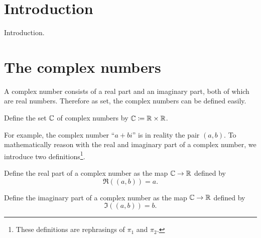 \documentclass[../main.tex]{subfiles}
\begin{document}
\section*{Introduction}
Introduction.

\section{The complex numbers}\label{sec:the_complex_numbers:the_complex_numbers}
A complex number consists of a real part and an imaginary part, both of which are real numbers. Therefore as set, the complex numbers can be defined easily.
\begin{definition}
    Define the set $\mathbb{C}$ of complex numbers by $\mathbb{C}\coloneq\mathbb{R}\times\mathbb{R}$.
\end{definition}
For example, the complex number ``$a+bi$'' is in reality the pair $(a,b)$. To mathematically reason with the real and imaginary part of a complex number, we introduce two definitions\footnote{These definitions are rephrasings of $\pi_1$ and $\pi_2$.}.
\begin{definition}
    Define the real part of a complex number as the map $\mathbb{C}\to\mathbb{R}$ defined by
    \begin{equation*}
        \Re((a,b))=a.
    \end{equation*}
\end{definition}
\begin{definition}
    Define the imaginary part of a complex number as the map $\mathbb{C}\to\mathbb{R}$ defined by
    \begin{equation*}
        \Im((a,b))=b.
    \end{equation*}
\end{definition}
\end{document}
